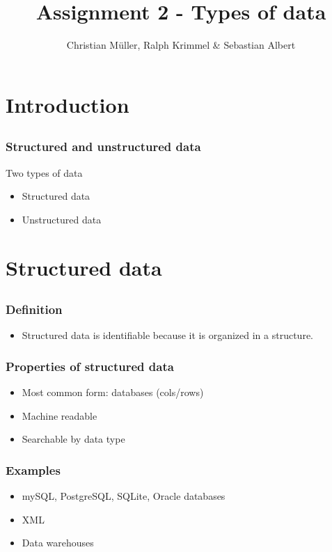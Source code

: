 \documentclass{beamer}
\title{Assignment 2 - Types of data}
\author{Christian Müller, Ralph Krimmel \& Sebastian Albert}
\begin{document}
\section{Introduction}
\subsection*{}
\begin{frame}
	\maketitle
\end{frame}

\begin{frame}
	\frametitle{Structured and unstructured data}
	\begin{block}{Two types of data}
	\begin{itemize}
		\item Structured data
		\item Unstructured data
	\end{itemize}
	\end{block}
\end{frame}

\section{Structured data}
\subsection*{}
\begin{frame}
	\frametitle{Definition}
	\begin{itemize}
		\item Structured data is identifiable because it is organized in a structure.
	\end{itemize}
\end{frame}

\begin{frame}
	\frametitle{Properties of structured data}
	\begin{itemize}
		\item Most common form: databases (cols/rows)
		\item Machine readable 
		\item Searchable by data type
	\end{itemize}
\end{frame}

\begin{frame}
	\frametitle{Examples}
	\begin{itemize}
		\item mySQL, PostgreSQL, SQLite, Oracle databases
		\item XML
		\item Data warehouses
	\end{itemize}
\end{frame}
\end{document}
